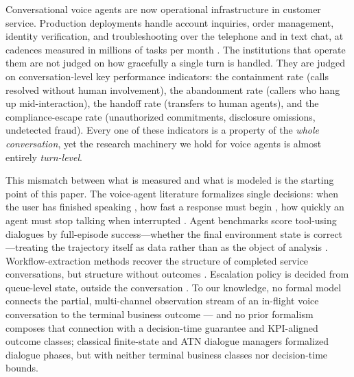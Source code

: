 Conversational voice agents are now operational infrastructure in customer service.
Production deployments handle account inquiries, order management, identity verification, and
troubleshooting over the telephone and in text chat, at cadences measured in millions of
tasks per month \citep{nubank2026}.
The institutions that operate them are not judged on how gracefully a single turn is handled.
They are judged on conversation-level key performance indicators:
the containment rate (calls resolved without human involvement),
the abandonment rate (callers who hang up mid-interaction),
the handoff rate (transfers to human agents),
and the compliance-escape rate (unauthorized commitments, disclosure omissions, undetected fraud).
Every one of these indicators is a property of the \emph{whole conversation},
yet the research machinery we hold for voice agents is almost entirely \emph{turn-level}.

This mismatch between what is measured and what is modeled is the starting point of this paper.
The voice-agent literature formalizes single decisions:
when the user has finished speaking \citep{tauvoice2026,x2turn2026},
how fast a response must begin \citep{garcia2026latencyfloor},
how quickly an agent must stop talking when interrupted \citep{garcia2026cessationfloor}.
Agent benchmarks score tool-using dialogues by full-episode success---whether the final
environment state is correct---treating the trajectory itself as data rather than as the object
of analysis \citep{sierra2024taubench}.
Workflow-extraction methods recover the structure of completed service conversations,
but structure without outcomes \citep{salesforce2025workflows}.
Escalation policy is decided from queue-level state, outside the conversation \citep{queuecontrol2026}.
To our knowledge, no formal model connects the partial, multi-channel observation stream of an
in-flight voice conversation to the terminal business outcome --- and no prior formalism composes
that connection with a decision-time guarantee and KPI-aligned outcome classes; classical
finite-state and ATN dialogue managers formalized dialogue phases, but with neither terminal
business classes nor decision-time bounds.

